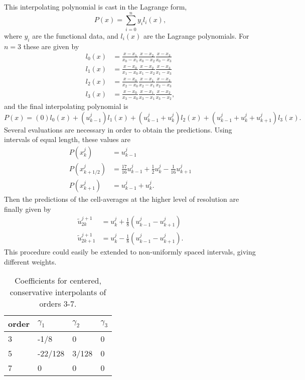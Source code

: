 \documentclass[]{article}
\begin{document}
    This interpolating polynomial is cast in the Lagrange form,
    \begin{equation}
    P(x) = \sum_{i=0}^{n} y_{i} l_{i}(x),
    \end{equation}
    where $y_{i}$ are the functional data, and $l_{i}(x)$ are the Lagrange polynomials. For $n=3$ these
    are given by
    \begin{align}
        l_{0}(x) &= \frac{x-x_1}{x_0-x_1} \frac{x-x_2}{x_0-x_2} \frac{x-x_3}{x_0-x_3} \\
        l_{1}(x) &= \frac{x-x_0}{x_1-x_0} \frac{x-x_2}{x_1-x_2} \frac{x-x_3}{x_1-x_3} \\
        l_{2}(x) &= \frac{x-x_0}{x_2-x_0} \frac{x-x_1}{x_2-x_1} \frac{x-x_3}{x_2-x_3} \\
        l_{3}(x) &= \frac{x-x_0}{x_3-x_0} \frac{x-x_1}{x_3-x_1} \frac{x-x_2}{x_3-x_2},
    \end{align}
    and the final interpolating polynomial is
    \begin{equation}
        P(x) = (0) l_{0}(x) + ( u^{j}_{k-1} ) l_{1}(x) + ( u^{j}_{k-1} + u^{j}_{k} ) l_{2}(x)
            + ( u^{j}_{k-1} + u^{j}_{k} + u^{j}_{k+1} ) l_{3}(x).
    \end{equation}
    Several evaluations are necessary in order to obtain the predictions. Using intervals of equal length, these values are
    \begin{align}
        P(x^{j}_{k}) &= u^{j}_{k-1} \\
        P(x^{j}_{k+1/2}) &= \frac{17}{16} u^{j}_{k-1} + \frac{1}{2} u^{j}_{k} - \frac{1}{16} u^{j}_{k+1} \\
        P(x^{j}_{k+1}) &= u^{j}_{k-1} + u^{j}_{k}.
    \end{align}
    Then the predictions of the cell-averages at the higher level of resolution are finally given by
    \begin{align}
        \tilde{u}^{j+1}_{2k} & = u^{j}_{k} + \frac{1}{8} \left( u^{j}_{k-1} - u^{j}_{k+1} \right) \\
        \tilde{u}^{j+1}_{2k+1} & = u^{j}_{k} - \frac{1}{8} \left( u^{j}_{k-1} - u^{j}_{k+1} \right).
    \end{align}
    This procedure could easily be extended to non-uniformly spaced intervals,
    giving different weights.
    \begin{table}
        \center
        \begin{tabular}{|l|l|l|l|}
        \hline
            order    & $\gamma_{1}$ & $\gamma_{2}$ & $\gamma_{3}$ \\ \hline
            3 & -1/8          & 0            & 0            \\ \hline
            5 & -22/128      & 3/128        & 0            \\ \hline
            7 & 0            & 0            & 0            \\ \hline
        \end{tabular}
        \label{coeff1}
        \caption{Coefficients for centered, conservative interpolants of orders 3-7.}
    \end{table}
\end{document}
